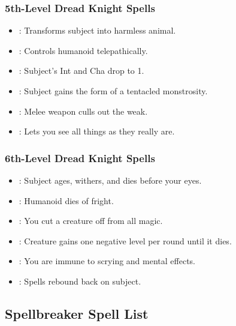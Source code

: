 \subsubsection{5th-Level Dread Knight Spells}
\begin{itemize}
\item {}: Transforms subject into harmless animal.
\item {}: Controls humanoid telepathically.
\item {}: Subject's Int and Cha drop to 1.
\item {}: Subject gains the form of a tentacled monstrosity.
\item {}: Melee weapon culls out the weak.
\item {}: Lets you see all things as they really are.
\end{itemize}
\subsubsection{6th-Level Dread Knight Spells}
\begin{itemize}
\item {}: Subject ages, withers, and dies before your eyes.
\item {}: Humanoid dies of fright.
\item {}: You cut a creature off from all magic.
\item {}: Creature gains one negative level per round until it dies.
\item {}: You are immune to scrying and mental effects.
\item {}: Spells rebound back on subject.
\end{itemize}

\subsection{Spellbreaker Spell List}
